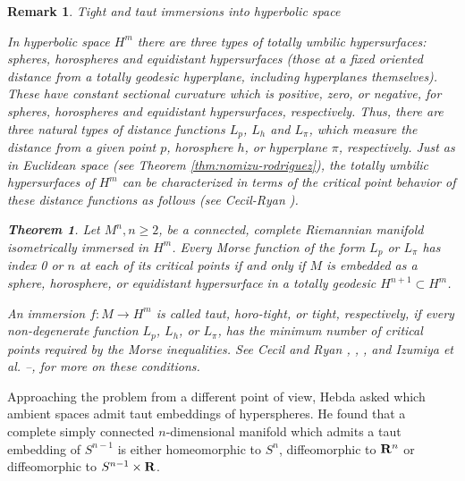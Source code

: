 \documentclass[12pt]{article}
\newtheorem{theorem}{Theorem}[section]
\newtheorem{remark}{Remark}[section]
\begin{document}
{\begin{remark}{Tight and taut immersions into hyperbolic space}
\noindent
{\rm In hyperbolic space $H^m$ there are three types of totally umbilic hypersurfaces: spheres, horospheres
and equidistant hypersurfaces (those at a fixed oriented distance from a totally geodesic
hyperplane, including hyperplanes themselves). 
These have constant sectional curvature which is positive, zero, or negative, for spheres, horospheres and equidistant hypersurfaces, respectively.  Thus, there are three natural types of distance
functions $L_p$, $L_h$ and $L_\pi$, which measure the distance
from a given point $p$, horosphere $h$, or hyperplane $\pi$, respectively. Just as in Euclidean space 
(see Theorem \ref{thm:nomizu-rodriguez}),
the totally umbilic hypersurfaces of $H^m$ can be characterized in terms of the critical point behavior of these distance functions as follows (see Cecil-Ryan \cite{CRNag}).

\begin{theorem}
\label{thm:C-R-10.1}
Let $M^n, n\geq 2$, be a connected, complete Riemannian manifold isometrically immersed in $H^m$. Every Morse function of the form $L_p$ or $L_\pi$ has index 0 or $n$ at each of its critical points if and only if $M$
is embedded as a sphere, horosphere, or equidistant hypersurface in a totally geodesic $H^{n+1} \subset H^m$.
\end{theorem}
An immersion $f:M \rightarrow H^m$ is called {\em taut}, 
{\em horo-tight}, or {\em tight}, respectively, 
if every non-degenerate function $L_p$, $L_h$, or $L_\pi$, has the minimum number of critical points
required by the Morse inequalities.  See Cecil and Ryan \cite{CRNag}, \cite{CRLon}, \cite[pp. 233--236]{CR7}, and Izumiya et al. \cite{Izumiya2005}--\cite{Izumiya2003},
for more on these conditions. }
\end{remark}


Approaching the problem from a different point of
view, Hebda \cite{Heb1} asked which ambient spaces admit taut embeddings
of hyperspheres.
He found that a complete simply connected $n$-dimensional manifold
which admits a taut embedding of $S^{n-1}$ is either homeomorphic
to $S^n$, diffeomorphic to ${\bf R}^n$ or diffeomorphic to
$S^{n-1} \times {\bf R}$.

}
\end{document}
